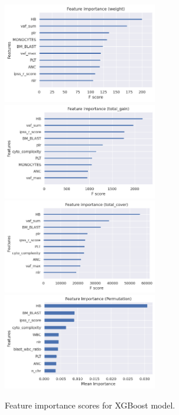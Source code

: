 \documentclass{article}
\begin{document}
\begin{figure}[htbp!]
    \centering
    \includegraphics[width=0.6\textwidth]{img/feature_importance_xgb_weight.png}
    \includegraphics[width=0.6\textwidth]{img/feature_importance_xgb_total_gain.png}
    \includegraphics[width=0.6\textwidth]{img/feature_importance_xgb_total_cover.png}
    \includegraphics[width=0.6\textwidth]{img/feature_importance_xgb_permutation.png}
    \caption{Feature importance scores for XGBoost model.}
    \label{fig:feature_importance}
\end{figure}
\end{document}
